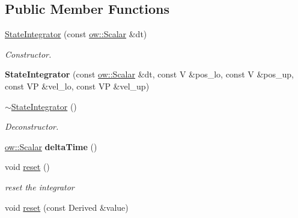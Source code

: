 \subsection*{Public Member Functions}
\begin{DoxyCompactItemize}
\item 
\hyperlink{classow__core_1_1StateIntegrator_a0652f8379accc0afa2dfdd05f499f9ed}{State\+Integrator} (const \hyperlink{types_8h_ac412879ee4a239c8032aa2d647f4a74a}{ow\+::\+Scalar} \&dt)\hypertarget{classow__core_1_1StateIntegrator_a0652f8379accc0afa2dfdd05f499f9ed}{}\label{classow__core_1_1StateIntegrator_a0652f8379accc0afa2dfdd05f499f9ed}

\begin{DoxyCompactList}\small\item\em Constructor. \end{DoxyCompactList}\item 
{\bfseries State\+Integrator} (const \hyperlink{types_8h_ac412879ee4a239c8032aa2d647f4a74a}{ow\+::\+Scalar} \&dt, const V \&pos\+\_\+lo, const V \&pos\+\_\+up, const VP \&vel\+\_\+lo, const VP \&vel\+\_\+up)\hypertarget{classow__core_1_1StateIntegrator_aa6ff9c143fde8ad4d29a729d39e01cfd}{}\label{classow__core_1_1StateIntegrator_aa6ff9c143fde8ad4d29a729d39e01cfd}

\item 
\hyperlink{classow__core_1_1StateIntegrator_a5b5ffabeb22df0fe1eacd65cedbe6ea1}{$\sim$\+State\+Integrator} ()\hypertarget{classow__core_1_1StateIntegrator_a5b5ffabeb22df0fe1eacd65cedbe6ea1}{}\label{classow__core_1_1StateIntegrator_a5b5ffabeb22df0fe1eacd65cedbe6ea1}

\begin{DoxyCompactList}\small\item\em Deconstructor. \end{DoxyCompactList}\item 
\hyperlink{types_8h_ac412879ee4a239c8032aa2d647f4a74a}{ow\+::\+Scalar} {\bfseries delta\+Time} ()\hypertarget{classow__core_1_1StateIntegrator_a8afcf6e8c593886387b3ae7e763e701e}{}\label{classow__core_1_1StateIntegrator_a8afcf6e8c593886387b3ae7e763e701e}

\item 
void \hyperlink{classow__core_1_1StateIntegrator_a02ce56518e5caba2ba5e79c4ae586d98}{reset} ()\hypertarget{classow__core_1_1StateIntegrator_a02ce56518e5caba2ba5e79c4ae586d98}{}\label{classow__core_1_1StateIntegrator_a02ce56518e5caba2ba5e79c4ae586d98}

\begin{DoxyCompactList}\small\item\em reset the integrator \end{DoxyCompactList}\item 
void \hyperlink{classow__core_1_1StateIntegrator_ae2e982140221b72b11d6e196b29bced3}{reset} (const Derived \&value)\hypertarget{classow__core_1_1StateIntegrator_ae2e982140221b72b11d6e196b29bced3}{}\label{classow__core_1_1StateIntegrator_ae2e982140221b72b11d6e196b29bced3}


\end{DoxyCompactItemize}
